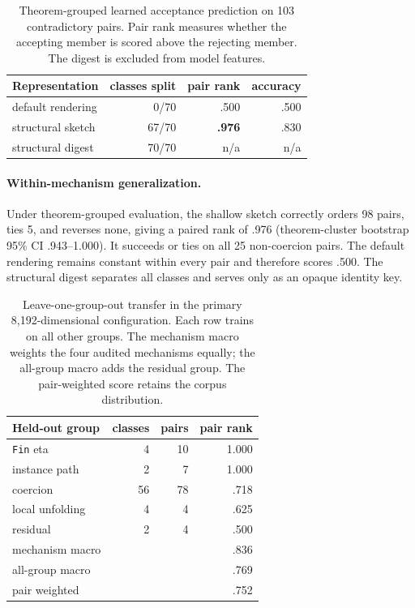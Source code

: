 \documentclass[11pt]{article}
\begin{document}
\begin{table}[t]\centering\small
\setlength{\tabcolsep}{4.0pt}
\begin{tabular}{@{}lrrr@{}}
\toprule
Representation & classes split & pair rank & accuracy \\
\midrule
default rendering & 0/70 & .500 & .500 \\
structural sketch & 67/70 & \textbf{.976} & .830 \\
structural digest & 70/70 & n/a & n/a \\
\bottomrule
\end{tabular}
\caption{Theorem-grouped learned acceptance prediction on 103 contradictory
pairs. Pair rank measures whether the accepting member is scored above the
rejecting member. The digest is excluded from model features.}
\label{tab:representation}
\end{table}

\paragraph{Within-mechanism generalization.}
Under theorem-grouped evaluation, the shallow sketch correctly orders 98 pairs,
ties 5, and reverses none, giving a paired rank of .976 (theorem-cluster
bootstrap 95\% CI .943--1.000). It succeeds or ties on all 25 non-coercion
pairs. The
default rendering remains constant within every pair and therefore scores .500.
The structural digest separates all classes and serves only as an opaque
identity key.

\begin{table}[t]\centering\small
\setlength{\tabcolsep}{3.5pt}
\begin{tabular}{@{}lrrr@{}}
\toprule
Held-out group & classes & pairs & pair rank \\
\midrule
\texttt{Fin} eta & 4 & 10 & 1.000 \\
instance path & 2 & 7 & 1.000 \\
coercion & 56 & 78 & .718 \\
local unfolding & 4 & 4 & .625 \\
residual & 2 & 4 & .500 \\
\midrule
mechanism macro & & & .836 \\
all-group macro & & & .769 \\
pair weighted & & & .752 \\
\bottomrule
\end{tabular}
\caption{Leave-one-group-out transfer in the primary 8{,}192-dimensional
configuration. Each row trains on all other groups. The mechanism macro weights
the four audited mechanisms equally; the all-group macro adds the residual
group. The pair-weighted score retains the corpus distribution.}
\label{tab:representation-robust}
\end{table}
\end{document}
